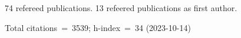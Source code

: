 74 refereed publications. 13 refeered publications as first author.

Total citations~=~3539; h-index~=~34 (2023-10-14)